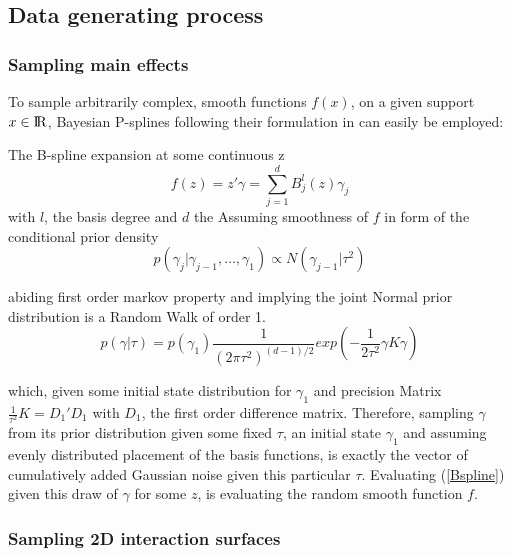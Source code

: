 \documentclass[11pt]{article}
\begin{document}
        \subsection{Data generating process}
            \subsubsection{Sampling main effects} \label{maineffect}
            To sample arbitrarily complex, smooth functions $f(x)$, on a given support $x \in {\rm I\!R}$, Bayesian P-splines following their formulation in \citep{fahrmeir2013regression} can easily be employed:

            The B-spline expansion at some continuous z
            \begin{equation} \label{Bspline}
                f(z) = z'\gamma = \sum_{j=1}^d B_j^l (z)\gamma_j
            \end{equation}
            with $l$, the basis degree and $d$ the
            Assuming smoothness of $f$ in form of the conditional prior density
            \begin{equation}
                p(\gamma_j|\gamma_{j-1}, \dots, \gamma_1) \propto N(\gamma_{j-1}|\tau^2)
            \end{equation}

            abiding first order markov property and implying the joint Normal prior distribution is a Random Walk of order 1.
            \begin{equation} \label{1dprior}
                p(\gamma|\tau) = p(\gamma_1)\frac{1}{(2\pi\tau^2)^{(d-1)/2}}exp\left( -\frac{1}{2\tau^2} \gamma K \gamma \right)
            \end{equation}

            which, given some initial state distribution for $\gamma_1$ and precision Matrix $\frac{1}{\tau^2}K = D_1'D_1$ with $D_1$, the first order difference matrix.  Therefore, sampling $\gamma$ from its prior distribution given some fixed $\tau$, an initial state $\gamma_1$ and assuming evenly distributed placement of the basis functions, is exactly the vector of cumulatively added Gaussian noise given this particular $\tau$. Evaluating (\ref{Bspline}) given this draw of $\gamma$ for some $z$, is evaluating the random smooth function $f$.



            \subsubsection{Sampling 2D interaction surfaces}
\end{document}
